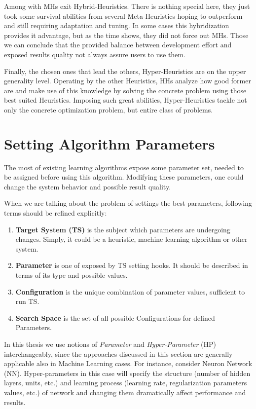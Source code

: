 Among with MHs exit Hybrid-Heuristics. There is nothing special here, they just took some survival abilities from several Meta-Heuristics hoping to outperform and still requiring adaptation and tuning. In some cases this hybridization provides it advantage, but as the time shows, they did not force out MHs. Those we can conclude that the provided balance between development effort and exposed results quality not always assure users to use them.

Finally, the chosen ones that lead the others, Hyper-Heuristics are on the upper generality level. 
Operating by the other Heuristics, HHs analyze how good former are and make use of this knowledge by solving the concrete problem using those best suited Heuristics. Imposing such great abilities, Hyper-Heuristics tackle not only the concrete optimization problem, but entire class of problems.


\section{Setting Algorithm Parameters}\label{bg: section Parameters Setting}
The most of existing learning algorithms expose some parameter set, needed to be assigned before using this algorithm. Modifying these parameters, one could change the system behavior and possible result quality.

When we are talking about the problem of settings the best parameters, following terms should be refined explicitly:
\begin{enumerate}
	\item \textbf{Target System (TS)} is the subject which parameters are undergoing changes. Simply, it could be a heuristic, machine learning algorithm or other system.
	\item \textbf{Parameter} is one of exposed by TS setting hooks. It should be described in terms of its type and possible values.
	\item \textbf{Configuration} is the unique combination of parameter values, sufficient to run TS.
	\item \textbf{Search Space} is the set of all possible Configurations for defined Parameters.
\end{enumerate}

In this thesis we use notions of \textit{Parameter} and \textit{Hyper-Parameter} (HP) interchangeably, since the approaches discussed in this section are generally applicable also in Machine Learning cases. For instance, consider Neuron Network (NN). Hyper-parameters in this case will specify the structure (number of hidden layers, units, etc.) and learning process (learning rate, regularization parameters values, etc.) of network and changing them dramatically affect performance and results.

